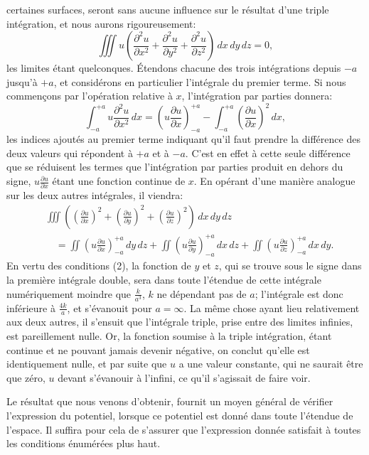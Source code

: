 \documentclass[11pt]{article}
\begin{document}
certaines surfaces, seront sans aucune influence sur le résultat d'une triple intégration, et nous aurons rigoureusement:
\[
\iiint u\left(\frac{\partial^2 u}{\partial x^2}+\frac{\partial^2 u}{\partial y^2}+\frac{\partial^2 u}{\partial z^2}\right)\,dx\,dy\,dz=0,
\]
les limites étant quelconques. Étendons chacune des trois intégrations depuis $-a$ jusqu'à $+a$, et considérons en particulier l'intégrale du premier terme. Si nous commençons par l'opération relative à $x$, l'intégration par parties donnera:
\[
\int_{-a}^{+a}u\frac{\partial^2u}{\partial x^2}\,dx=
\left(u\frac{\partial u}{\partial x}\right)_{-a}^{+a}-
\int_{-a}^{+a}\left(\frac{\partial u}{\partial x}\right)^2\,dx,
\]
les indices ajoutés au premier terme indiquant qu'il faut prendre la différence des deux valeurs qui répondent à $+a$ et à $-a$. C'est en effet à cette seule différence que se réduisent les termes que l'intégration par parties produit en dehors du signe, $u\frac{\partial u}{\partial x}$ étant une fonction continue de $x$. En opérant d'une manière analogue sur les deux autres intégrales, il viendra:
\begin{align*}
&\iiint\left(\left(\frac{\partial u}{\partial x}\right)^2+\left(\frac{\partial u}{\partial y}\right)^2+\left(\frac{\partial u}{\partial z}\right)^2\right)\,dx\,dy\,dz \\
&\quad=\iint\left(u\frac{\partial u}{\partial x}\right)_{-a}^{+a}\,dy\,dz
+\iint\left(u\frac{\partial u}{\partial y}\right)_{-a}^{+a}\,dx\,dz
+\iint\left(u\frac{\partial u}{\partial z}\right)_{-a}^{+a}\,dx\,dy.
\end{align*}
En vertu des conditions (2), la fonction de $y$ et $z$, qui se trouve sous le signe dans la première intégrale double, sera dans toute l'étendue de cette intégrale numériquement moindre que $\frac{k}{a^3}$, $k$ ne dépendant pas de $a$; l'intégrale est donc inférieure à $\frac{4k}{a}$, et s'évanouit pour $a=\infty$. La même chose ayant lieu relativement aux deux autres, il s'ensuit que l'intégrale triple, prise entre des limites infinies, est pareillement nulle. Or, la fonction soumise à la triple intégration, étant continue et ne pouvant jamais devenir négative, on conclut qu'elle est identiquement nulle, et par suite que $u$ a une valeur constante, qui ne saurait être que zéro, $u$ devant s'évanouir à l'infini, ce qu'il s'agissait de faire voir.

Le résultat que nous venons d'obtenir, fournit un moyen général de vérifier l'expression du potentiel, lorsque ce potentiel est donné dans toute l'étendue de l'espace. Il suffira pour cela de s'assurer que l'expression donnée satisfait à toutes les conditions énumérées plus haut.
\end{document}
